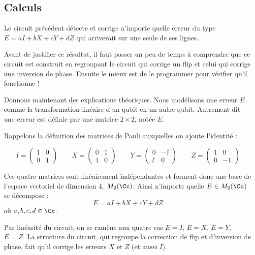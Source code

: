 \documentclass[11pt,class=report,crop=false]{standalone}
\begin{document}
\subsection{Calculs}


\begin{proposition}
Le circuit précédent détecte et corrige n'importe quelle erreur du type $E = aI+bX+cY+dZ$ qui arriverait sur une seule de ses lignes.
\end{proposition}

Avant de justifier ce résultat, il faut passer un peu de temps à comprendre que ce circuit est construit en regroupant le circuit qui corrige un flip et celui qui corrige une inversion de phase. Ensuite le mieux est de le programmer pour vérifier qu'il fonctionne !

\bigskip

Donnons maintenant des explications théoriques. Nous modélisons une erreur $E$ comme la transformation linéaire d'un qubit en un autre qubit.
Autrement dit une erreur est définie par une matrice $2\times 2$, notée $E$.

Rappelons la définition des matrices de Pauli auxquelles on ajoute l'identité :

$$
I = \begin{pmatrix}1&0\\0&1\end{pmatrix}\qquad
X = \begin{pmatrix}0&1\\1&0\end{pmatrix}\qquad
Y = \begin{pmatrix}0&-\ii\\\ii&0\end{pmatrix}\qquad
Z = \begin{pmatrix}1&0\\0&-1\end{pmatrix}
$$

Ces quatre matrices sont linéairement indépendantes et forment donc une base de l'espace vectoriel de dimension $4$,  $M_2(\Cc)$. Ainsi n'importe quelle $E \in M_2(\Cc)$ se décompose :
$$E = aI+bX+cY+dZ$$
où $a,b,c,d \in \Cc$.

Par linéarité du circuit, on se ramène aux quatre cas $E=I$, $E=X$, $E=Y$, $E=Z$.
La structure du circuit, qui regroupe la correction de flip et d'inversion de phase, fait qu'il corrige les erreurs $X$ et $Z$ (et aussi $I$).
\end{document}
